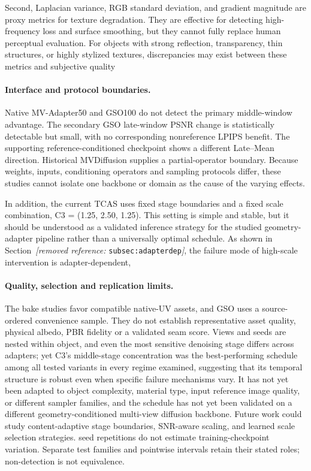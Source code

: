 \documentclass[times,twocolumn,final]{elsarticle}
\providecommand{\DIFadd}[1]{{\protect\color{blue} \sf #1}} %
\providecommand{\DIFdel}[1]{{\protect\color{red} \scriptsize #1}} %
\providecommand{\DIFaddbegin}{} %
\providecommand{\DIFaddend}{} %
\providecommand{\DIFdelbegin}{} %
\providecommand{\DIFdelend}{} %
\begin{document}
\DIFdelbegin \DIFdel{Second, Laplacian variance, RGB standard deviation, and gradient magnitude are proxy metrics for texture degradation. They are effective for detecting high-frequency loss and surface smoothing, but they cannot fully replace human perceptual evaluation. For objects with strong reflection, transparency, thin structures, or highly stylized textures, discrepancies may exist between these metrics and subjective quality}\DIFdelend \DIFaddbegin \paragraph{Interface and protocol boundaries.}
\DIFadd{Native MV-Adapter50 and GSO100 do not detect the primary middle-window advantage. The secondary GSO late-window PSNR change is statistically detectable but small, with no corresponding nonreference LPIPS benefit. The supporting reference-conditioned checkpoint shows a different Late--Mean direction. Historical MVDiffusion supplies a partial-operator boundary. Because weights, inputs, conditioning operators and sampling protocols differ, these studies cannot isolate one backbone or domain as the cause of the varying effects}\DIFaddend .

\DIFdelbegin \DIFdel{In addition, the current TCAS uses fixed stage boundaries and a fixed scale combination, C3 = (1.25, 2.50, 1.25). This setting is simple and stable, but it should be understood as a validated inference strategy for the studied geometry-adapter pipeline rather than a universally optimal schedule.
As shown in Section~\textit{[removed reference: }\texttt{subsec:adapterdep}\textit{]}, the failure mode of high-scale intervention is adapter-dependent, }\DIFdelend \DIFaddbegin \paragraph{Quality, selection and replication limits.}
\DIFadd{The bake studies favor compatible native-UV assets, and GSO uses a source-ordered convenience sample. They do not establish representative asset quality, physical albedo, PBR fidelity or a validated seam score. Views and seeds are nested within object, }\DIFaddend and \DIFdelbegin \DIFdel{even the most sensitive denoising stage differs across adapters; yet C3's middle-stage concentration was the best-performing schedule among all tested variants in every regime examined, suggesting that its temporal structure is robust even when specific failure mechanisms vary. It has not yet been adapted to object complexity, material type, input reference image quality, or different sampler families, and the schedule has not yet been validated on a different geometry-conditioned multi-view diffusion backbone. Future work could study content-adaptive stage boundaries, SNR-aware scaling, and learned scale selection strategies.
}\DIFdelend \DIFaddbegin \DIFadd{seed repetitions do not estimate training-checkpoint variation. Separate test families and pointwise intervals retain their stated roles; non-detection is not equivalence.
}\DIFaddend 
\end{document}
